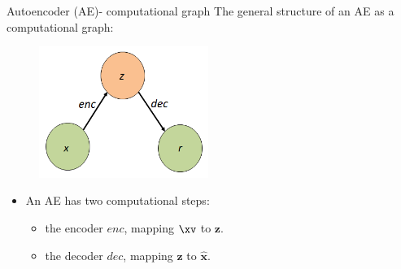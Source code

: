 \begin{vbframe}{Autoencoder (AE)- computational graph}
  The general structure of an AE as a computational graph:
  \begin{figure}
    \centering
    \includegraphics[width=5.5cm]{plots/autoencoder_basic_structure.png}
  \end{figure}
  \begin{itemize}
    \item An AE has two computational steps:
    \begin{itemize}
      \item the encoder $enc$, mapping $\xv$ to $\mathbf{z}$.
      \item the decoder $dec$, mapping $\mathbf{z}$ to $\mathbf{\hat x}$.
    \end{itemize}
  \end{itemize}
\end{vbframe}
%
%
